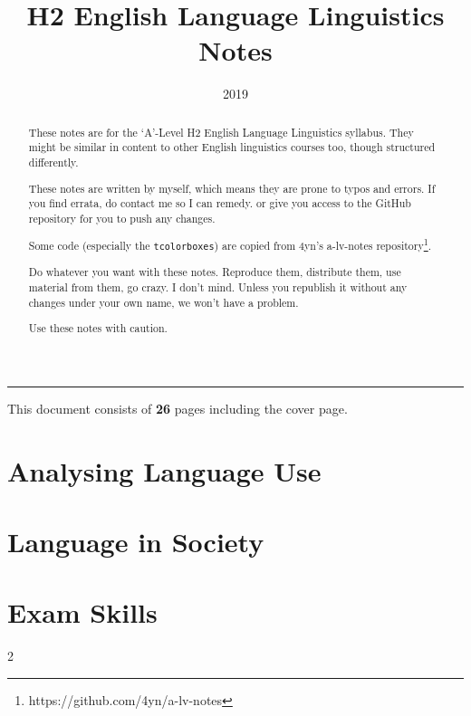 \documentclass[10pt]{article}
\title{H2 English Language Linguistics Notes}
\author{}
\date{2019}
\begin{document}
\maketitle

\begin{abstract}
	These notes are for the `A'-Level H2 English Language Linguistics syllabus. They might be similar in content to other English linguistics courses too, though structured differently.
	
	These notes are written by myself, which means they are prone to typos and errors. If you find errata, do contact me so I can remedy. or give you access to the GitHub repository for you to push any changes.
	
	Some code (especially the \texttt{tcolorboxes}) are copied from 4yn's a-lv-notes repository\footnote{https://github.com/4yn/a-lv-notes}.
	
	Do whatever you want with these notes. Reproduce them, distribute them, use material from them, go crazy. I don't mind. Unless you republish it without any changes under your own name, we won't have a problem.
	
	Use these notes with caution.
\end{abstract}

\begin{multicols}{2} 
\tableofcontents
\end{multicols}

\vspace*{\fill}
\hrule
\begin{center}
	This document consists of \textbf{26} pages including the cover page.
\end{center}


\newpage

\begin{multicols}{2}
	\part{Analysing Language Use}
	
	
	
	
	
	
	
	

	\part{Language in Society}
	
	
	
	
	
	
	
	
	
	
	
	
	

	\part{Exam Skills}
	
\end{multicols}{2}
\end{document}
